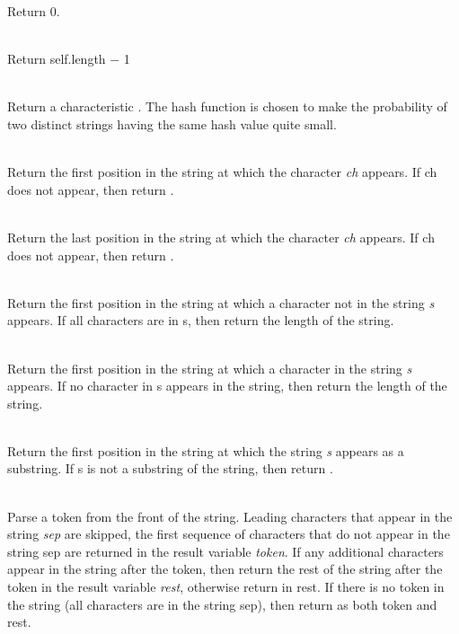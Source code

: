 \begin{desc}
    Return 0.
  \item[\kw{function} upperbound \returns{} \/\LB{}\tn{Integer}\/\RB{}]~\\
    Return self.length $-$ 1
  \item[\kw{function} hash \returns{} \/\LB{}\tn{Integer}\/\RB{}]~\\
    Return a characteristic .  The hash function is chosen to
    make the probability of two distinct strings having the same hash value
    quite small.
  \item[\kw{function} index\/\LB{}ch \CO{} \tn{Character}\/\RB{} \returns{} \/\LB{}r \CO{} \tn{Integer}\/\RB{}]~\\
    Return the first position in the string at which the character {\it ch}
    appears.  If ch does not appear, then return .
  \item[\kw{function} rindex\/\LB{}ch \CO{} \tn{Character}\/\RB{} \returns{}
	  \/\LB{}r \CO{} \tn{Integer}\/\RB{}]~\\ 
    Return the last position in the string at which the character {\it ch}
    appears.  If ch does not appear, then return .
  \item[\kw{function} span\/\LB{}s \CO{} \tn{String}\/\RB{} \returns{} \/\LB{}r \CO{} \tn{Integer}\/\RB{}]~\\
    Return the first position in the string at which a character not in the
    string {\it s} appears.  If all characters are in s, then return the
    length of the string.
  \item[\kw{function} cspan\/\LB{}s \CO{} \tn{String}\/\RB{} \returns{} \/\LB{}r \CO{} \tn{Integer}\/\RB{}]~\\
    Return the first position in the string at which a character in the
    string {\it s} appears.  If no character in s appears in the string,
    then return the length of the string.
  \item[\kw{function} str\/\LB{}s \CO{} \tn{String}\/\RB{} \returns{} \/\LB{}r \CO{} \tn{Integer}\/\RB{}]~\\
    Return the first position in the string at which the string {\it s}
    appears as a substring.  If s is not a substring of the string, then
    return .
  \item[\kw{operation} token\/\LB{}sep \CO{} \tn{String}\/\RB{} \returns{} \/\LB{}token \CO{} \tn{String}, rest\CO{} \tn{String}\/\RB{}]~\\
    Parse a token from the front of the string.  Leading characters that
    appear in the string {\it sep} are skipped, the first sequence of
    characters that do not appear in the string sep are returned in the
    result variable {\it token}.  If any additional characters appear in the
    string after the token, then return the rest of the string after the token
    in the result variable {\it rest}, otherwise return  in rest.
    If there is no token in the string (all characters are in the string
    sep), then return  as both token and rest.
\end{desc}


